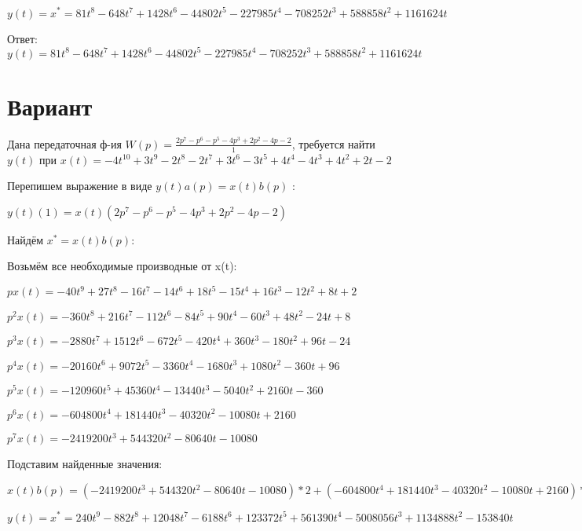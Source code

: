 \documentclass{article}
\begin{document}
{{{{{$y(t)=x^*=81t^{8}-648t^{7}+1428t^{6}-44802t^{5}-227985t^{4}-708252t^{3}+588858t^{2}+1161624t$

Ответ: $y(t) = 81t^{8}-648t^{7}+1428t^{6}-44802t^{5}-227985t^{4}-708252t^{3}+588858t^{2}+1161624t$

\section{Вариант}

Дана передаточная ф-ия $W(p)=\frac{2p^{7}-p^{6}-p^{5}-4p^{3}+2p^{2}-4p-2}{1}$, требуется найти $y(t)$ при $x(t)=-4t^{10}+3t^{9}-2t^{8}-2t^{7}+3t^{6}-3t^{5}+4t^{4}-4t^{3}+4t^{2}+2t-2$

Перепишем выражение в виде $y(t)a(p)=x(t)b(p)$ :

$y(t)(1)=x(t)(2p^{7}-p^{6}-p^{5}-4p^{3}+2p^{2}-4p-2)$

Найдём $x^*=x(t)b(p)$:

Возьмём все необходимые производные от x(t):

$px(t)=-40t^{9}+27t^{8}-16t^{7}-14t^{6}+18t^{5}-15t^{4}+16t^{3}-12t^{2}+8t+2$

$p^2x(t)=-360t^{8}+216t^{7}-112t^{6}-84t^{5}+90t^{4}-60t^{3}+48t^{2}-24t+8$

$p^3x(t)=-2880t^{7}+1512t^{6}-672t^{5}-420t^{4}+360t^{3}-180t^{2}+96t-24$

$p^4x(t)=-20160t^{6}+9072t^{5}-3360t^{4}-1680t^{3}+1080t^{2}-360t+96$

$p^5x(t)=-120960t^{5}+45360t^{4}-13440t^{3}-5040t^{2}+2160t-360$

$p^6x(t)=-604800t^{4}+181440t^{3}-40320t^{2}-10080t+2160$

$p^7x(t)=-2419200t^{3}+544320t^{2}-80640t-10080$

Подставим найденные значения:

$x(t)b(p) = (-2419200t^{3}+544320t^{2}-80640t-10080)*2+(-604800t^{4}+181440t^{3}-40320t^{2}-10080t+2160)*(-1)+(-120960t^{5}+45360t^{4}-13440t^{3}-5040t^{2}+2160t-360)*(-1)+(-2880t^{7}+1512t^{6}-672t^{5}-420t^{4}+360t^{3}-180t^{2}+96t-24)*(-4)+(-360t^{8}+216t^{7}-112t^{6}-84t^{5}+90t^{4}-60t^{3}+48t^{2}-24t+8)*2+(-40t^{9}+27t^{8}-16t^{7}-14t^{6}+18t^{5}-15t^{4}+16t^{3}-12t^{2}+8t+2)*(-4)+(-40t^{9}+27t^{8}-16t^{7}-14t^{6}+18t^{5}-15t^{4}+16t^{3}-12t^{2}+8t+2)*(-2)=240t^{9}-882t^{8}+12048t^{7}-6188t^{6}+123372t^{5}+561390t^{4}-5008056t^{3}+1134888t^{2}-153840t$





$y(t)=x^*=240t^{9}-882t^{8}+12048t^{7}-6188t^{6}+123372t^{5}+561390t^{4}-5008056t^{3}+1134888t^{2}-153840t$

}}}}}
\end{document}
